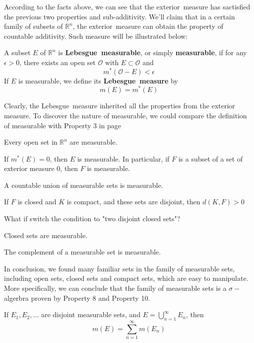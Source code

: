\documentclass{ctexbook}
\begin{document}
According to the facts above, we can see that the exterior~measure has sactisfied the previous two properties and sub-additivity.
We'll claim that in a certain family of subsets of $\mathbb{R}^n$, the exterior~measure can obtain the property of countable
additivity. Such measure will be illustrated below:

\begin{define}
    A subset $E$ of $\mathbb{R}^n$ is \textbf{Lebesgue~measurable}, or simply \textbf{measurable}, if for any $\epsilon>0$,
    there exists an open set $\mathcal{O} $ with $E \subset \mathcal{O} $ and 
    \[m^*(\mathcal{O} - E) < \epsilon\]
    If $E$ is measurable, we define its \textbf{Lebesgue~measure} by \[m(E)=m^*(E)\]
\end{define}
Clearly, the Lebesgue~measure inherited all the properties from the exterior measure. To discover the nature of measurable,
we could compare the definition of measurable with Property 3 in page \pageref{sec exterior measure:open set}

\begin{prop}
    Every open set in $\mathbb{R}^n$ are measurable.
\end{prop}
\begin{prop}
    If $m^*(E)=0$, then $E$ is measurable. In particular, if $F$ is a subset of a set of exterior measure 0, then $F$ is measurable.
\end{prop}
\begin{prop}
    A countable union of measurable sets is measurable.
\end{prop}
\begin{lema}
    If $F$ is closed and $K$ is compact, and these sets are disjoint, then $d(K,F)>0$
\end{lema}
\noindent What if switch the condition to "two disjoint closed sets"?
\begin{prop}
    Closed sets are measurable.
\end{prop}
\begin{prop}
    The complement of a measurable set is measurable.
\end{prop}
In conclusion, we found many familiar sets in the family of measurable sets, including open sets, closed sets and compact sets,
which are easy to manipulate. More specifically, we can conclude that the family of measurable sets is a $\sigma-$algerbra proven
by Property 8 and Property 10.

\begin{thm}
    If $E_1,E_2,\ldots$ are disjoint measurable sets, and $E = \bigcup\limits_{n=1}^{\infty}E_n$, then
    \[m(E)=\sum\limits_{n=1}^{\infty}m(E_n)\]
\end{thm}
\end{document}
